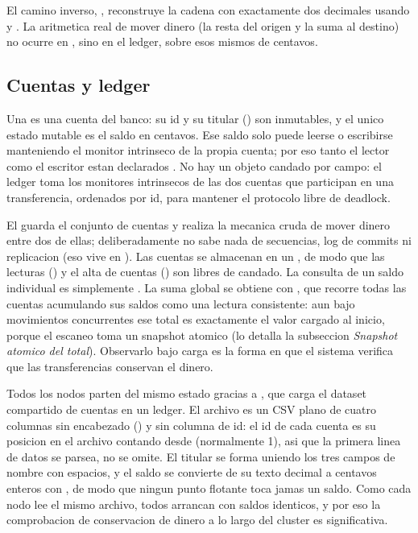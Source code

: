 El camino inverso, , reconstruye la cadena con
exactamente dos decimales usando  y
. La aritmetica real de mover dinero (la resta del origen y
la suma al destino) no ocurre en , sino en el ledger, sobre esos
mismos  de centavos.

\subsection{Cuentas y ledger}

Una  es una cuenta del banco: su id y su titular
() son inmutables, y el unico estado mutable es el saldo en
centavos. Ese saldo solo puede leerse o escribirse manteniendo el monitor
intrinseco de la propia cuenta; por eso tanto el lector 
como el escritor  estan declarados
. No hay un objeto candado por campo: el ledger toma los
monitores intrinsecos de las dos cuentas que participan en una transferencia,
ordenados por id, para mantener el protocolo libre de deadlock.

El  guarda el conjunto de cuentas y realiza la mecanica
cruda de mover dinero entre dos de ellas; deliberadamente no sabe nada de
secuencias, log de commits ni replicacion (eso vive en ). Las
cuentas se almacenan en un , de modo
que las lecturas () y el alta de cuentas () son libres de
candado. La consulta de un saldo individual es simplemente
. La suma global se obtiene con
, que recorre todas las cuentas acumulando sus saldos como
una lectura consistente: aun bajo movimientos concurrentes ese total es
exactamente el valor cargado al inicio, porque el escaneo toma un snapshot
atomico (lo detalla la subseccion \emph{Snapshot atomico del total}). Observarlo
bajo carga es la forma en que el sistema verifica que las transferencias
conservan el dinero.

Todos los nodos parten del mismo estado gracias a ,
que carga el dataset compartido de cuentas en un ledger. El archivo es un CSV
plano de cuatro columnas sin encabezado
() y sin columna de id: el id de
cada cuenta es su posicion en el archivo contando desde 
(normalmente 1), asi que la primera linea de datos se parsea, no se omite. El
titular se forma uniendo los tres campos de nombre con espacios, y el saldo se
convierte de su texto decimal a centavos enteros con , de
modo que ningun punto flotante toca jamas un saldo. Como cada nodo lee el mismo
archivo, todos arrancan con saldos identicos, y por eso la comprobacion de
conservacion de dinero a lo largo del cluster es significativa.

